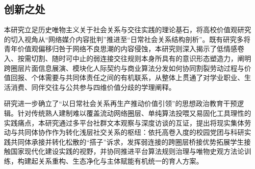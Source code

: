 \subsection{创新之处}

本研究立足历史唯物主义关于社会关系与交往实践的理论基石，将高校价值观研究的切入视角从“网络媒介内容批判”推进至“日常社会关系结构剖析”。既有研究多将青年价值观偏移归咎于网络不良思潮的内容侵蚀，本研究则深入揭示了低情感卷入、按需切割、随时可中止的弱连接交往规则本身所具有的意识形态塑造力，阐明跨圈层片面信息展演、模块化人际契约与商业算法分发如何协同割裂劳动过程与价值回报、个体需要与共同体责任之间的有机联系，从整体上贯通了对学业职业、生活消费、同伴交往与公共参与四维价值分歧的学理阐释。

研究进一步确立了“以日常社会关系再生产推动价值引领”的思想政治教育干预逻辑。针对传统熟人建制难以覆盖流动网络圈层、单纯算法投喂又易固化工具理性的实践痛点，本研究通过多平台社群文本观察与深度访谈的互证，提出将现实集体劳动与共同体协作作为转化浅层社交关系的枢纽：依托高卷入度的校园党团与科研实践共同体承接并转化松散的“搭子”诉求，发挥弱连接的跨圈层桥接优势拓展学生接触国家现代化建设实践的视野，并协同推进平台算法规则治理与唯物史观方法论训练，构建起关系重构、生态净化与主体赋能有机统一的育人方案。
